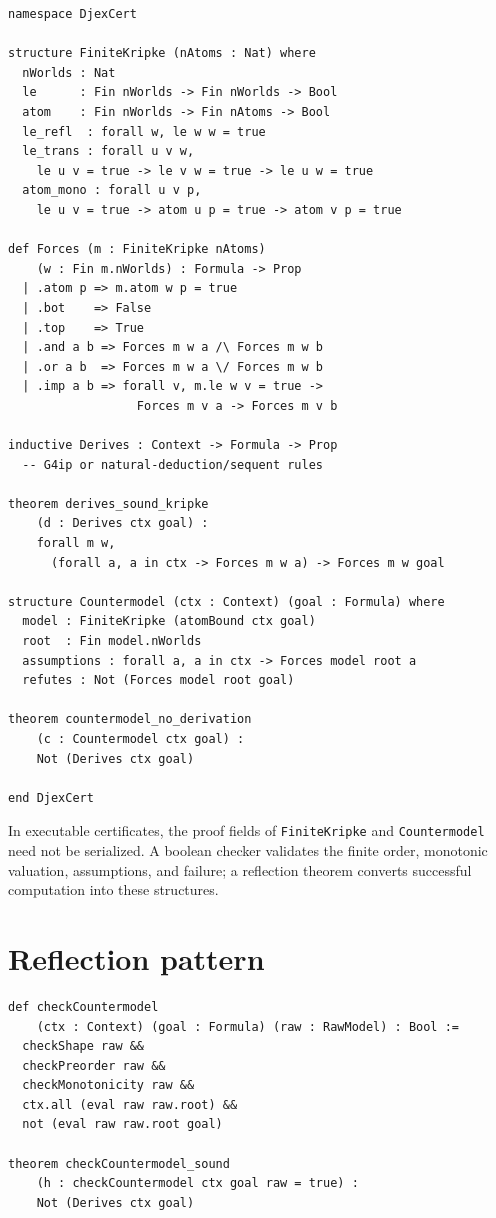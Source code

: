 \documentclass[11pt,letterpaper,openany]{report}
\theoremstyle{definition}
\theoremstyle{remark}
\newcommand{\code}[1]{\texttt{#1}}
\begin{document}
\begin{lstlisting}[language=LeanFour,caption={Finite Kripke countermodel interface.}]
namespace DjexCert

structure FiniteKripke (nAtoms : Nat) where
  nWorlds : Nat
  le      : Fin nWorlds -> Fin nWorlds -> Bool
  atom    : Fin nWorlds -> Fin nAtoms -> Bool
  le_refl  : forall w, le w w = true
  le_trans : forall u v w,
    le u v = true -> le v w = true -> le u w = true
  atom_mono : forall u v p,
    le u v = true -> atom u p = true -> atom v p = true

def Forces (m : FiniteKripke nAtoms)
    (w : Fin m.nWorlds) : Formula -> Prop
  | .atom p => m.atom w p = true
  | .bot    => False
  | .top    => True
  | .and a b => Forces m w a /\ Forces m w b
  | .or a b  => Forces m w a \/ Forces m w b
  | .imp a b => forall v, m.le w v = true ->
                  Forces m v a -> Forces m v b

inductive Derives : Context -> Formula -> Prop
  -- G4ip or natural-deduction/sequent rules

theorem derives_sound_kripke
    (d : Derives ctx goal) :
    forall m w,
      (forall a, a in ctx -> Forces m w a) -> Forces m w goal

structure Countermodel (ctx : Context) (goal : Formula) where
  model : FiniteKripke (atomBound ctx goal)
  root  : Fin model.nWorlds
  assumptions : forall a, a in ctx -> Forces model root a
  refutes : Not (Forces model root goal)

theorem countermodel_no_derivation
    (c : Countermodel ctx goal) :
    Not (Derives ctx goal)

end DjexCert
\end{lstlisting}

In executable certificates, the proof fields of \code{FiniteKripke} and \code{Countermodel} need not be serialized. A boolean checker validates the finite order, monotonic valuation, assumptions, and failure; a reflection theorem converts successful computation into these structures.

\section{Reflection pattern}

\begin{lstlisting}[language=LeanFour,caption={Certificate checking by reflection.}]
def checkCountermodel
    (ctx : Context) (goal : Formula) (raw : RawModel) : Bool :=
  checkShape raw &&
  checkPreorder raw &&
  checkMonotonicity raw &&
  ctx.all (eval raw raw.root) &&
  not (eval raw raw.root goal)

theorem checkCountermodel_sound
    (h : checkCountermodel ctx goal raw = true) :
    Not (Derives ctx goal)
\end{lstlisting}
\end{document}
